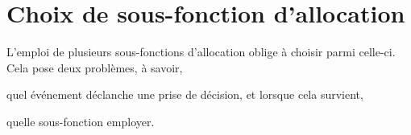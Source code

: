 
\section{Choix de sous-fonction d'allocation}
\label{repl:sec:allocationchoice}

L'emploi de plusieurs sous-fonctions d'allocation oblige à choisir parmi
celle-ci. Cela pose deux problèmes, à savoir,
\begin{inparaenum}[(i)]
\item quel événement déclanche une prise de décision, et lorsque cela survient, 
\item quelle sous-fonction employer.
\end{inparaenum}
